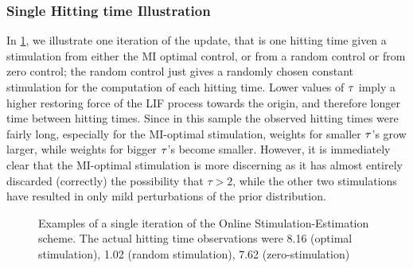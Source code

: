\subsubsection{Single Hitting time Illustration}
In \cref{fig:example_online_miopt_single_iteration}, we
illustrate one iteration of the update, that is one hitting time given a
stimulation from either the MI optimal control, or from a random
control or from zero control; the random control 
just gives a randomly chosen constant stimulation for the computation
of each hitting time. 
Lower values of ${ \tau }$ imply a higher restoring force of the LIF
process towards the origin, and therefore longer time between hitting times.
Since in this sample the observed hitting times were fairly long, especially for
the MI-optimal stimulation, weights for smaller ${\tau}$'s grow larger, while weights
for bigger ${\tau}$'s become smaller. However, it is immediately clear that the
MI-optimal stimulation is more discerning as it has almost entirely discarded
(correctly) the possibility that $\tau>2$, while the other two stimulations have
resulted in only mild perturbations of the prior distribution.

\begin{figure}[h]
\begin{center} 
\caption[Effect of the First Observation on the Belief
Distribution]{Examples of a single iteration of the Online Stimulation-Estimation scheme.
The actual hitting time observations were 8.16 (optimal stimulation), 1.02
(random stimulation), 7.62 (zero-stimulation) }
\label{fig:example_online_miopt_single_iteration}
\end{center}
\end{figure}  

